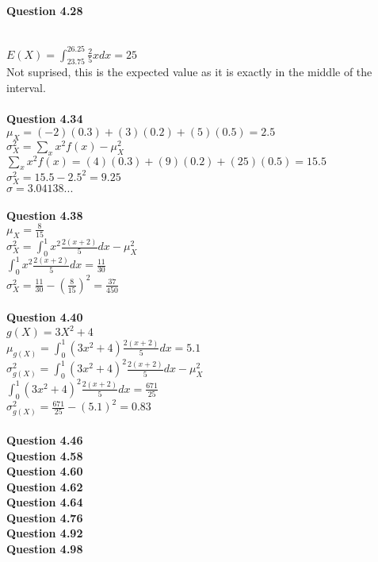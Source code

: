 \documentclass{article}
\begin{document}
    \textbf{Question 4.28}\\
        \\
        $E(X) = \int_{23.75}^{26.25}\frac{2}{5}xdx = 25$\\
        Not suprised, this is the expected value as it is exactly in the middle of the interval.\\\\
    \textbf{Question 4.34}\\
        $\mu_X = (-2)(0.3)+(3)(0.2)+(5)(0.5) = 2.5$\\
        $\sigma_X^2 = \sum_{x}x^2f(x)-\mu_X^2$\\
        $\sum_{x}x^2f(x) = (4)(0.3) + (9)(0.2) + (25)(0.5) = 15.5$\\
        $\sigma_X^2 =15.5 - 2.5^2 = 9.25$\\
        $\sigma = 3.04138...$
        \\\\
    \textbf{Question 4.38}\\
        $\mu_X = \frac{8}{15}$\\
        $\sigma_X^2 = \int_{0}^{1}x^2\frac{2(x+2)}{5}dx-\mu_X^2$\\
        $\int_{0}^{1}x^2\frac{2(x+2)}{5}dx = \frac{11}{30}$\\
        $\sigma_X^2=\frac{11}{30} - (\frac{8}{15})^2 = \frac{37}{450}$
        \\\\
    \textbf{Question 4.40}\\
        $g(X) = 3X^2+4$\\
        $\mu_{g(X)} = \int_{0}^{1}(3x^2+4)\frac{2(x+2)}{5}dx = 5.1$\\
        $\sigma_{g(X)}^2 = \int_{0}^{1}(3x^2+4)^2\frac{2(x+2)}{5}dx-\mu_X^2$\\
        $\int_{0}^{1}(3x^2+4)^2\frac{2(x+2)}{5}dx = \frac{671}{25}$\\
        $\sigma_{g(X)}^2 = \frac{671}{25} - (5.1)^2 = 0.83$
        \\\\
    \textbf{Question 4.46}\\
    \textbf{Question 4.58}\\
    \textbf{Question 4.60}\\
    \textbf{Question 4.62}\\
    \textbf{Question 4.64}\\
    \textbf{Question 4.76}\\
    \textbf{Question 4.92}\\
    \textbf{Question 4.98}\\
\end{document}
